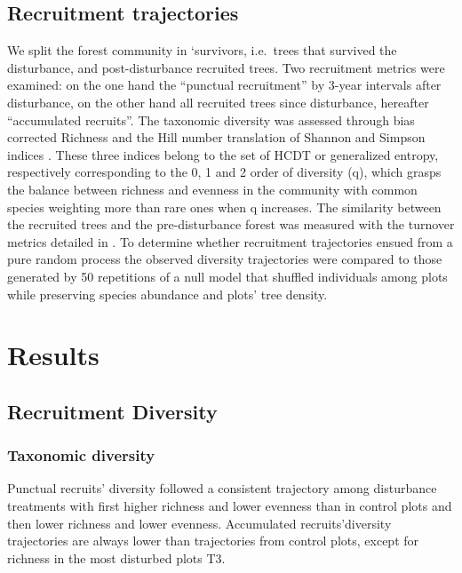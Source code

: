 \documentclass[fleqn,10pt]{ArtEcoFoG} %
\begin{document}
\subsection{Recruitment trajectories}\label{recruitment-trajectories}

We split the forest community in `survivors, i.e.~trees that survived
the disturbance, and post-disturbance recruited trees. Two recruitment
metrics were examined: on the one hand the ``punctual recruitment'' by
3-year intervals after disturbance, on the other hand all recruited
trees since disturbance, hereafter ``accumulated recruits''. The
taxonomic diversity was assessed through bias corrected Richness and the
Hill number translation of Shannon and Simpson indices
\citep{Hill1973, chao2015estimating, Marcon2015b}. These three indices
belong to the set of HCDT or generalized entropy, respectively
corresponding to the 0, 1 and 2 order of diversity (q), which grasps the
balance between richness and evenness in the community with common
species weighting more than rare ones when q increases. The similarity
between the recruited trees and the pre-disturbance forest was measured
with the turnover metrics detailed in \citet{Podani2013a}. To determine
whether recruitment trajectories ensued from a pure random process the
observed diversity trajectories were compared to those generated by 50
repetitions of a null model that shuffled individuals among plots while
preserving species abundance and plots' tree density.

\section{Results}\label{results}

\subsection{Recruitment Diversity}\label{recruitment-diversity}

\subsubsection{Taxonomic diversity}\label{taxonomic-diversity}

Punctual recruits' diversity followed a consistent trajectory among
disturbance treatments with first higher richness and lower evenness
than in control plots and then lower richness and lower evenness.
Accumulated recruits'diversity trajectories are always lower than
trajectories from control plots, except for richness in the most
disturbed plots T3.
\end{document}
